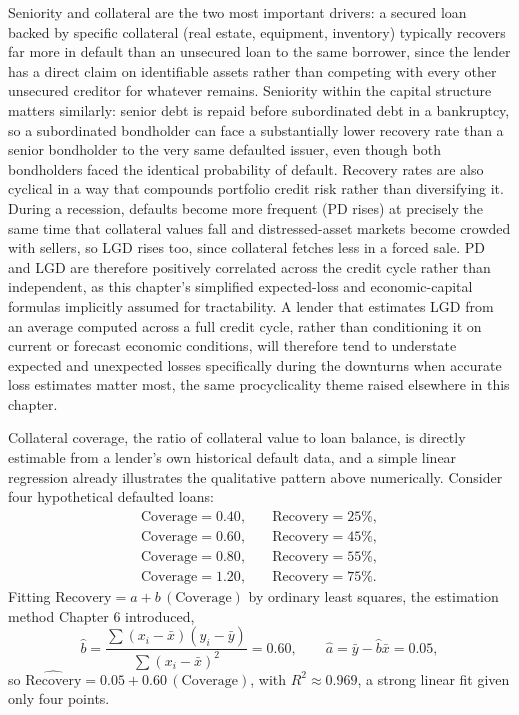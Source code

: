 \documentclass[../ai_in_finance]{subfiles}
\begin{document}
Seniority and collateral are the two most important drivers: a secured loan backed by specific collateral (real estate, equipment, inventory) typically recovers far more in default than an unsecured loan to the same borrower, since the lender has a direct claim on identifiable assets rather than competing with every other unsecured creditor for whatever remains. Seniority within the capital structure matters similarly: senior debt is repaid before subordinated debt in a bankruptcy, so a subordinated bondholder can face a substantially lower recovery rate than a senior bondholder to the very same defaulted issuer, even though both bondholders faced the identical probability of default.
Recovery rates are also cyclical in a way that compounds portfolio credit risk rather than diversifying it. During a recession, defaults become more frequent (PD rises) at precisely the same time that collateral values fall and distressed-asset markets become crowded with sellers, so LGD rises too, since collateral fetches less in a forced sale. PD and LGD are therefore positively correlated across the credit cycle rather than independent, as this chapter's simplified expected-loss and economic-capital formulas implicitly assumed for tractability.
A lender that estimates LGD from an average computed across a full credit cycle, rather than conditioning it on current or forecast economic conditions, will therefore tend to understate expected and unexpected losses specifically during the downturns when accurate loss estimates matter most, the same procyclicality theme raised elsewhere in this chapter.

Collateral coverage, the ratio of collateral value to loan balance, is directly estimable from a lender's own historical default data, and a simple linear regression already illustrates the qualitative pattern above numerically. Consider four hypothetical defaulted loans:
\begin{align*}
\text{Coverage} = 0.40, &\quad \text{Recovery} = 25\%, \\
\text{Coverage} = 0.60, &\quad \text{Recovery} = 45\%, \\
\text{Coverage} = 0.80, &\quad \text{Recovery} = 55\%, \\
\text{Coverage} = 1.20, &\quad \text{Recovery} = 75\%.
\end{align*} Fitting $\text{Recovery} = a + b\,(\text{Coverage})$ by ordinary least squares, the estimation method Chapter 6 introduced,
\begin{equation*}
\hat b = \frac{\sum (x_i-\bar x)(y_i - \bar y)}{\sum (x_i - \bar x)^2} = 0.60, \qquad \hat a = \bar y - \hat b \bar x = 0.05,
\end{equation*}
so $\widehat{\text{Recovery}} = 0.05 + 0.60\,(\text{Coverage})$, with $R^2\approx0.969$, a strong linear fit given only four points.
\end{document}
